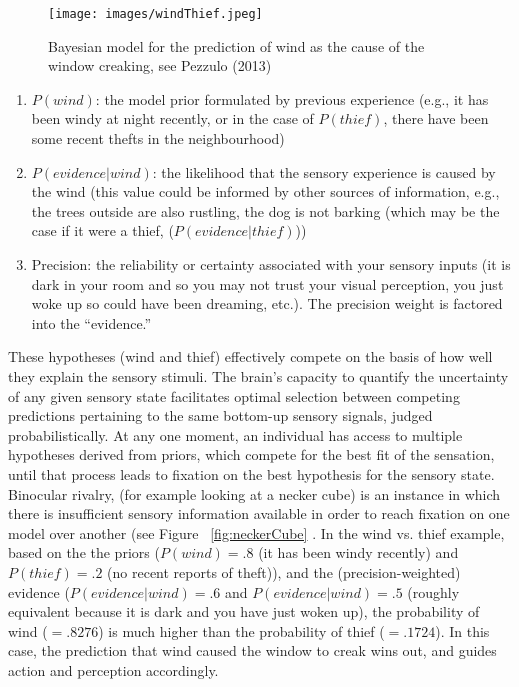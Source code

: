 \begin{CJK}{UTF8}{gbsn}
\begin{figure}[htbp]
  \begin{center}
    \texttt{[image: images/windThief.jpeg]}
      \caption{Bayesian model for the prediction of wind as the cause of the window creaking, see Pezzulo (2013)}
        \label{fig:windThief}
   \end{center}
\end{figure}


\begin{enumerate}
  \item $P(wind)$: the model prior formulated by previous experience (e.g., it has been windy at night recently, or in the case of $P(thief)$, there have been some recent thefts in the neighbourhood)
  \item $P(evidence|wind)$: the likelihood that the sensory experience is caused by the wind (this value could be informed by other sources of information, e.g., the trees outside are also rustling, the dog is not barking (which may be the case if it were a thief, ($P(evidence|thief)$))
  \item Precision: the reliability or certainty associated with your sensory inputs (it is dark in your room and so you may not trust your visual perception, you just woke up so could have been dreaming, etc.).  The precision weight is factored into the ``evidence.''
\end{enumerate}

These hypotheses (wind and thief) effectively compete on the basis of how well they explain the sensory stimuli.  The brain's capacity to quantify the uncertainty of any given sensory state facilitates optimal selection between competing predictions pertaining to the same bottom-up sensory signals, judged probabilistically.  At any one moment, an individual has access to multiple hypotheses derived from priors, which compete for the best fit of the sensation, until that process leads to fixation on the best hypothesis for the sensory state.  Binocular rivalry, (for example looking at a necker cube) is an instance in which there is insufficient sensory information available in order to reach fixation on one model over another (see Figure ~\ref{fig:neckerCube} \citep{Frith2007}.  In the wind vs. thief example, based on the the priors ($P(wind) = .8$ (it has been windy recently) and $P(thief) = .2$ (no recent reports of theft)), and the (precision-weighted) evidence ($P(evidence|wind) = .6$ and $P(evidence|wind) = .5$ (roughly equivalent because it is dark and you have just woken up), the probability of wind ($= .8276$) is much higher than the probability of thief ($= .1724$).  In this case, the prediction that wind caused the window to creak wins out, and guides action and perception accordingly.


\end{CJK}
